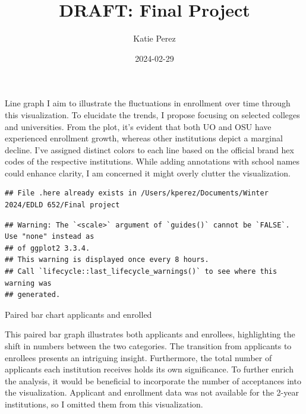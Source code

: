 \documentclass[
]{article}
\title{DRAFT: Final Project}
\author{Katie Perez}
\date{2024-02-29}
\begin{document}
\maketitle

Line graph I aim to illustrate the fluctuations in enrollment over time
through this visualization. To elucidate the trends, I propose focusing
on selected colleges and universities. From the plot, it's evident that
both UO and OSU have experienced enrollment growth, whereas other
institutions depict a marginal decline. I've assigned distinct colors to
each line based on the official brand hex codes of the respective
institutions. While adding annotations with school names could enhance
clarity, I am concerned it might overly clutter the visualization.

\begin{verbatim}
## File .here already exists in /Users/kperez/Documents/Winter 2024/EDLD 652/Final project
\end{verbatim}

\begin{verbatim}
## Warning: The `<scale>` argument of `guides()` cannot be `FALSE`. Use "none" instead as
## of ggplot2 3.3.4.
## This warning is displayed once every 8 hours.
## Call `lifecycle::last_lifecycle_warnings()` to see where this warning was
## generated.
\end{verbatim}

Paired bar chart applicants and enrolled

This paired bar graph illustrates both applicants and enrollees,
highlighting the shift in numbers between the two categories. The
transition from applicants to enrollees presents an intriguing insight.
Furthermore, the total number of applicants each institution receives
holds its own significance. To further enrich the analysis, it would be
beneficial to incorporate the number of acceptances into the
visualization. Applicant and enrollment data was not available for the
2-year institutions, so I omitted them from this visualization.
\end{document}
